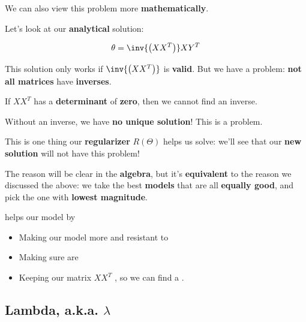         We can also view this problem more \textbf{mathematically}.
        
        Let's look at our \textbf{analytical} solution:
        
        \begin{equation}
            \theta = 
                \inv{  \left(  XX^T  \right)  }   X Y^T
        \end{equation}
        
        This solution only works if $\inv{  \left(  XX^T  \right)  }$ is \textbf{valid}. But we have a problem: \textbf{not all matrices} have \textbf{inverses}. 
        
        If $XX^T$ has a \textbf{determinant} of \textbf{zero}, then we cannot find an inverse. 
        
        Without an inverse, we have \textbf{no unique solution}! This is a problem.
        
        This is one thing our \textbf{regularizer} $R(\Theta)$ helps us solve: we'll see that our \textbf{new solution} will not have this problem! 
        
        The reason will be clear in the \textbf{algebra}, but it's \textbf{equivalent} to the reason we discussed the above: we take the best \textbf{models} that are all \textbf{equally good}, and pick the one with \textbf{lowest magnitude}.\\
        
        \begin{concept}
             helps  our model by
            
            \begin{itemize}
                \item Making our model more  and resistant to 
                \item Making sure  are 
                \item Keeping our matrix $XX^T$ , so we can find a .
            \end{itemize}
        \end{concept}
        
    \subsection{Lambda, a.k.a. $\lambda$}
    

